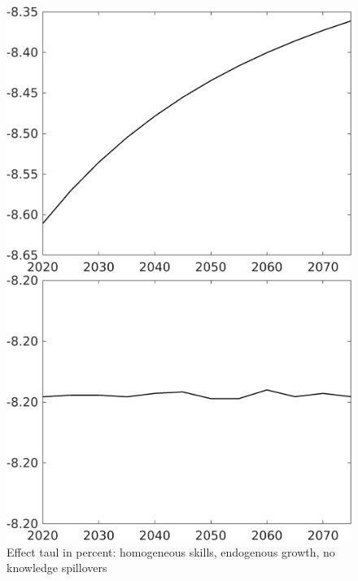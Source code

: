 \documentclass[12pt]{article}
\begin{document}
\begin{figure}[h!!]
	\centering
	\caption{Effect taul in percent: homogeneous skills, endogenous growth, no knowledge spillovers }\label{fig:LF_BAU_nsk1_xgr0_noknow}
	\begin{minipage}[]{0.32\textwidth}
		\includegraphics[width=1\textwidth]{../../codding_model/own_basedOnFried/optimalPol_010922_revision/figures/all_13Sept22/CompTaul_LFBAUPer_Reg0_Emnet_spillover0_nsk1_xgr0_knspil1_sep1_countec0_GovRev0_etaa0.79.png}
	\end{minipage}	
	\begin{minipage}[]{0.32\textwidth}
		\includegraphics[width=1\textwidth]{../../codding_model/own_basedOnFried/optimalPol_010922_revision/figures/all_13Sept22/CompTaul_LFBAUPer_Reg0_hh_spillover0_nsk1_xgr0_knspil1_sep1_countec0_GovRev0_etaa0.79.png}

\end{minipage}
\end{figure}
\end{document}
